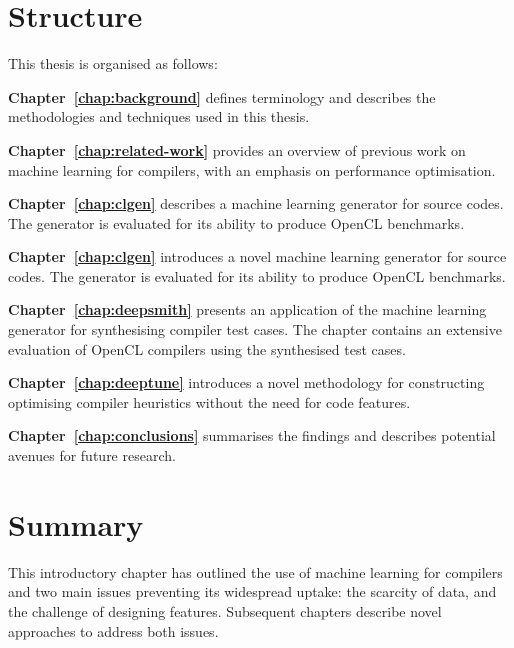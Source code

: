 \section{Structure}

This thesis is organised as follows:

\textbf{Chapter~\ref{chap:background}} defines terminology and describes the  methodologies and techniques used in this thesis.

\textbf{Chapter~\ref{chap:related-work}} provides an overview of previous work on machine learning for compilers, with an emphasis on performance optimisation.

\textbf{Chapter~\ref{chap:clgen}} describes a machine learning generator for source codes. The generator is evaluated for its ability to produce OpenCL benchmarks.

\textbf{Chapter~\ref{chap:clgen}} introduces a novel machine learning generator for source codes. The generator is evaluated for its ability to produce OpenCL benchmarks.

\textbf{Chapter~\ref{chap:deepsmith}} presents an application of the machine learning generator for synthesising compiler test cases. The chapter contains an extensive evaluation of OpenCL compilers using the synthesised test cases.

\textbf{Chapter~\ref{chap:deeptune}} introduces a novel methodology for constructing optimising compiler heuristics without the need for code features.

\textbf{Chapter~\ref{chap:conclusions}} summarises the findings and describes potential avenues for future research.


\section{Summary}

This introductory chapter has outlined the use of machine learning for compilers and two main issues preventing its widespread uptake: the scarcity of data, and the challenge of designing features. Subsequent chapters describe novel approaches to address both issues.
